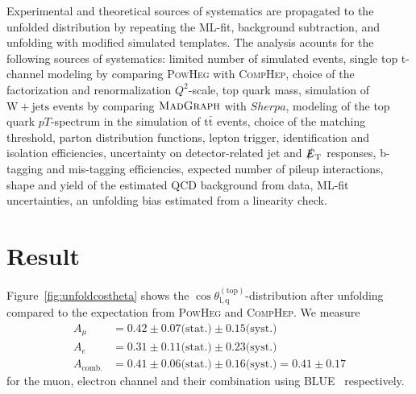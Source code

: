 \documentclass[a4paper]{jpconf}
\newcommand{\wjets}[0]{\mathrm{W+jets}}
\newcommand{\ttbar}[0]{\ensuremath{\mathrm{t\bar{t}}}}
\newcommand{\costheta}[0]{\cos\theta_{\mathrm{l,q}}^{\mathrm{(top)}}}
\newcommand{\met}[0]{\ensuremath{\slashed E_\mathrm{T}}}
\begin{document}
Experimental and theoretical sources of systematics are propagated to the unfolded distribution by repeating the ML-fit, background subtraction, and unfolding with modified simulated templates. The analysis acounts for the following sources of systematics: limited number of simulated events, single top t-channel modeling by comparing \textsc{PowHeg} with \textsc{CompHep}, choice of the factorization and renormalization $Q^{2}$-scale, top quark mass, simulation of $\wjets$ events by comparing $\textsc{MadGraph}$ with ${Sherpa}$, modeling of the  top quark $pT$-spectrum in the simulation of $\ttbar$ events, choice of the matching threshold, parton distribution functions, lepton trigger, identification and isolation efficiencies, uncertainty on detector-related jet and $\met$ responses, b-tagging and mis-tagging efficiencies, expected number of pileup interactions, shape and yield of the estimated QCD background from data, ML-fit uncertainties, an unfolding bias estimated from a linearity check.






\section{Result}

Figure~\ref{fig:unfoldcostheta} shows the $\costheta$-distribution after unfolding compared to the expectation from \textsc{PowHeg} and \textsc{CompHep}. We measure
\begin{align}
A_{\mu}&=0.42\pm 0.07 \textrm{(stat.)} \pm 0.15 \textrm{(syst.)} \\
A_{e}&=0.31\pm 0.11 \textrm{(stat.)} \pm 0.23 \textrm{(syst.)} \\
A_{\mathrm{comb.}}&=0.41\pm 0.06 \textrm{(stat.)} \pm 0.16 \textrm{(syst.)} = 0.41\pm 0.17
\end{align}
for the muon, electron channel and their combination using BLUE~\cite{blue} respectively.
\end{document}
